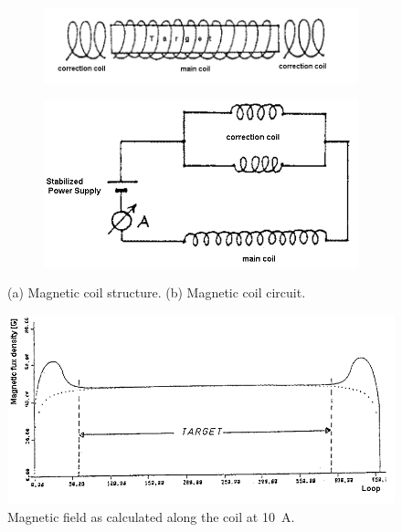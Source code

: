 \begin{figure}
\centering
   \begin{subfigure}[t]{0.49\linewidth}
  \centering
   \includegraphics[width=\linewidth]{./fig/coil1.png}
  \caption{}
\label{sfig:coil1}
  \end{subfigure}
   \begin{subfigure}[t]{0.49\linewidth}
  \centering
   \includegraphics[width=\linewidth]{./fig/coil2.png}
  \caption{}
\label{sfig:coil2}
  \end{subfigure}
\caption{(a) Magnetic coil structure. (b) Magnetic coil circuit.}
\label{fig:coil}
\end{figure}

\begin{figure}
\centering
 \includegraphics[width=\linewidth]{./fig/coillength.png}
\caption{Magnetic field as calculated along the coil at \SI{10}{\ampere}.}
\label{fig:fieldstr}
\end{figure}

